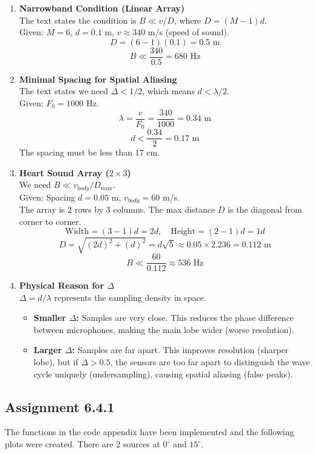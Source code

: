 \begin{enumerate}
    \item \textbf{Narrowband Condition (Linear Array)} \\
    The text states the condition is $B \ll v/D$, where $D = (M-1)d$. \\
    Given: $M=6$, $d=0.1$ m, $v \approx 340$ m/s (speed of sound).
    $$ D = (6-1)(0.1) = 0.5 \text{ m} $$
    $$ B \ll \frac{340}{0.5} = 680 \text{ Hz} $$
    
    \item \textbf{Minimal Spacing for Spatial Aliasing} \\
    The text states we need $\Delta < 1/2$, which means $d < \lambda/2$. \\
    Given: $F_0 = 1000$ Hz.
    $$ \lambda = \frac{v}{F_0} = \frac{340}{1000} = 0.34 \text{ m} $$
    $$ d < \frac{0.34}{2} = 0.17 \text{ m} $$
    The spacing must be less than 17 cm.

    \item \textbf{Heart Sound Array ($2 \times 3$)} \\
    We need $B \ll v_{body}/D_{max}$. \\
    Given: Spacing $d=0.05$ m, $v_{body} = 60$ m/s. \\
    The array is 2 rows by 3 columns. The max distance $D$ is the diagonal from corner to corner.
    $$ \text{Width} = (3-1)d = 2d, \quad \text{Height} = (2-1)d = 1d $$
    $$ D = \sqrt{(2d)^2 + (d)^2} = d\sqrt{5} \approx 0.05 \times 2.236 = 0.112 \text{ m} $$
    $$ B \ll \frac{60}{0.112} \approx 536 \text{ Hz} $$

    \item \textbf{Physical Reason for $\Delta$} \\
    $\Delta = d/\lambda$ represents the sampling density in space.
    \begin{itemize}
        \item \textbf{Smaller $\Delta$:} Samples are very close. This reduces the phase difference between microphones, making the main lobe wider (worse resolution).
        \item \textbf{Larger $\Delta$:} Samples are far apart. This improves resolution (sharper lobe), but if $\Delta > 0.5$, the sensors are too far apart to distinguish the wave cycle uniquely (undersampling), causing spatial aliasing (false peaks).
    \end{itemize}
\end{enumerate}

\subsection{Assignment 6.4.1}
\label{Assignment_6.4.1}
The functions in the code appendix have been implemented and the following plots were created. There are 2 sources at $0^\circ$ and $15^\circ$.

